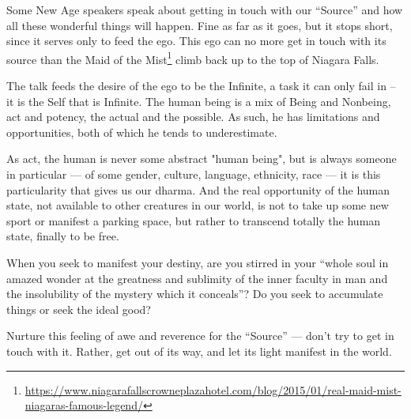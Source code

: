 Some New Age speakers speak about getting in touch with our ``Source'' and how all these wonderful things will happen. Fine as far as it goes, but it stops short, since it serves only to feed the ego. This ego can no more get in touch with its source than the Maid of the Mist\footnote{\url{https://www.niagarafallscrowneplazahotel.com/blog/2015/01/real-maid-mist-niagaras-famous-legend/}} climb back up to the top of Niagara Falls.

The talk feeds the desire of the ego to be the Infinite, a task it can only fail in -- it is the Self that is Infinite. The human being is a mix of Being and Nonbeing, act and potency, the actual and the possible. As such, he has limitations and opportunities, both of which he tends to underestimate.

As act, the human is never some abstract "human being", but is always someone in particular --- of some gender, culture, language, ethnicity, race --- it is this particularity that gives us our dharma. And the real opportunity of the human state, not available to other creatures in our world, is not to take up some new sport or manifest a parking space, but rather to transcend totally the human state, finally to be free.

When you seek to manifest your destiny, are you stirred in your ``whole soul in amazed wonder at the greatness and sublimity of the inner faculty in man and the insolubility of the mystery which it conceals''? Do you seek to accumulate things or seek the ideal good?

Nurture this feeling of awe and reverence for the ``Source'' --- don't try to get in touch with it. Rather, get out of its way, and let its light manifest in the world.



